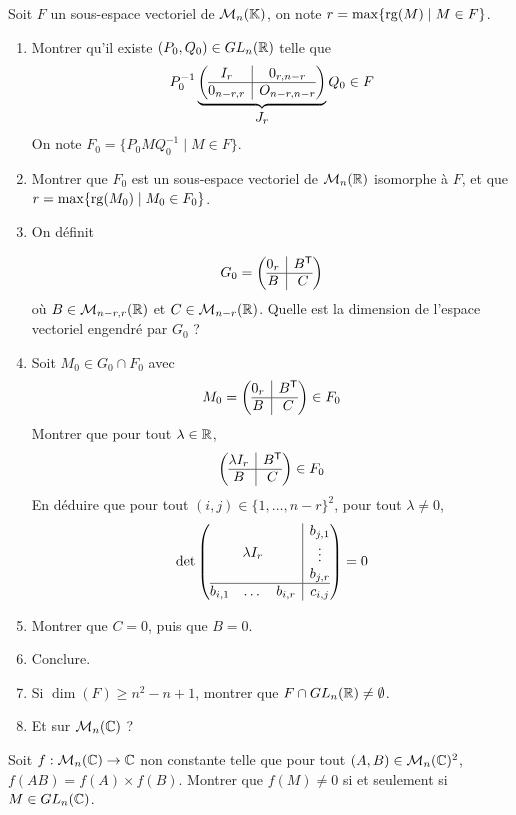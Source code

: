 \begin{exercise}
	Soit $F$ un sous-espace vectoriel de $\mathcal{M}_{n}(\mathbb{K})$, on note $r=\max\{\operatorname{rg}(M)\mid
	M\in F \}$.
	\begin{enumerate}
		\item
		Montrer qu'il existe $(P_{0},Q_{0})\in GL_{n}(\mathbb{R})$ telle que 
		$$
		P_{0}^{-1}
		\underbrace{
			\left(
				\begin{array}{@{}c|c@{}}
					I_{r}
					& 0_{r,n-r} \\
					\hline
					0_{n-r,r} &
					O_{n-r,n-r}
				\end{array}\right)
		}_{\displaystyle J_{r}}
		Q_{0}\in F
		$$
		On note $F_{0}=\{P_{0}MQ_{0}^{-1}\mid M\in F\}$.
		\item
		Montrer que $F_{0}$ est un sous-espace vectoriel de $\mathcal{M}_{n}(\mathbb{R})$ isomorphe
		à $F$, et que \\$r=\max\{\operatorname{rg}(M_{0})\mid M_{0}\in F_{0}\}$.
		\item
		On définit
		
		$$G_{0}= \left(
				\begin{array}{@{}c|c@{}}
					0_{r}
					& B^{\mathsf{T}} \\
					\hline
					B & C \end{array}\right)
		$$
		où $B\in\mathcal{M}_{n-r,r}(\mathbb{R})$ et $C\in\mathcal{M}_{n-r}(\mathbb{R})$. 
		Quelle est la dimension de l'espace vectoriel engendré par $G_{0}$ ?
		\item Soit $M_{0}\in G_{0}\cap F_{0}$ avec 
		$$
			M_{0}= \left(
				\begin{array}{@{}c|c@{}}
					0_{r}
					& B^{\mathsf{T}} \\
					\hline
					B & C
				\end{array}
			\right)
			\in
			F_{0}
		$$
		Montrer que pour tout $\lambda\in\mathbb{R}$,
		$$
			\left(
				\begin{array}{@{}c|c@{}}
				\lambda
				I_{r} & B^{\mathsf{T}} \\
					\hline
					B & C
				\end{array}
			\right)
			\in
			F_{0}
		$$
		En déduire que pour tout $(i,j)\in\{1,\dots, n-r\}^{2}$, pour tout $\lambda\neq0$,
		$$
		\det\left(
				\begin{array}{@{}c|c@{}}
				\lambda
				I_{r} &
				\begin{matrix}
				b_{j,1}\\
						\vdots\\
						b_{j,r}
						\end{matrix}
						\\
					\hline
					\begin{matrix}
						b_{i,1} &
						\dots
						& b_{i,r}
						\end{matrix}
						& c_{i,j}
				\end{array}
			\right)=0
		$$
		\item Montrer que $C=0$, puis que $B=0$.
		\item Conclure.
		\item Si $\dim(F)\geqslant n^{2}-n+1$, montrer que $F\cap GL_{n}(\mathbb{R})\neq\emptyset$.
		\item Et sur $\mathcal{M}_{n}(\mathbb{C})$ ?
	\end{enumerate}
\end{exercise}

\begin{exercise}
	Soit $f:\mathcal{M}_{n}(\mathbb{C})\to\mathbb{C}$ non constante telle que pour tout $(A,B)\in\mathcal{M}_{n}(\mathbb{C})^{2}$, $f(AB)=f(A)\times f(B)$. 
	Montrer que $f(M)\neq0$ si et seulement si $M\in GL_{n}(\mathbb{C})$.
\end{exercise}